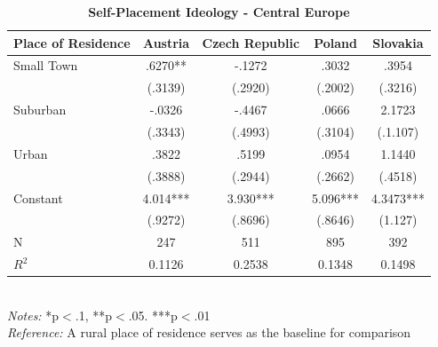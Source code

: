 \documentclass[12pt, titlepage]{article}
\newcommand\e{\emph}
\newcommand\tb{\textbf}
\begin{document}
\begin{singlespace}
	\begin{table}[H]
		\centering
		\caption{\tb{Self-Placement Ideology - Central Europe}}
		\begin{tabulary}{\linewidth}{l c c c c}

			\hline
			\tb{Place of Residence} &\tb{Austria}&\tb{Czech Republic}& \tb{Poland} &\tb{Slovakia} \\
			\hline
			Small Town&.6270**& -.1272 & .3032 & .3954  \\
			&(.3139) & (.2920) & (.2002) & (.3216) \\
			Suburban&-.0326& -.4467&.0666 & 2.1723\\
			&(.3343)&(.4993) & (.3104) & (.1.107)\\
			Urban&.3822&.5199 & .0954 & 1.1440 \\
			&(.3888) &(.2944) & (.2662) & (.4518) \\
			Constant& 4.014***& 3.930***& 5.096*** & 4.3473***  \\
			&(.9272) & (.8696) & (.8646) & (1.127) \\
			N&247& 511& 895 & 392 \\
			$R^2$&0.1126&0.2538 & 0.1348 & 0.1498 \\
			\hline
		\end{tabulary}
		\\
		\e{Notes:} *p$<$.1, **p$<$.05. ***p$<$.01 \\
		\e{Reference:} A rural place of residence serves as the baseline for comparison
		\label{table6}
	\end{table}
\end{singlespace}
\end{document}
